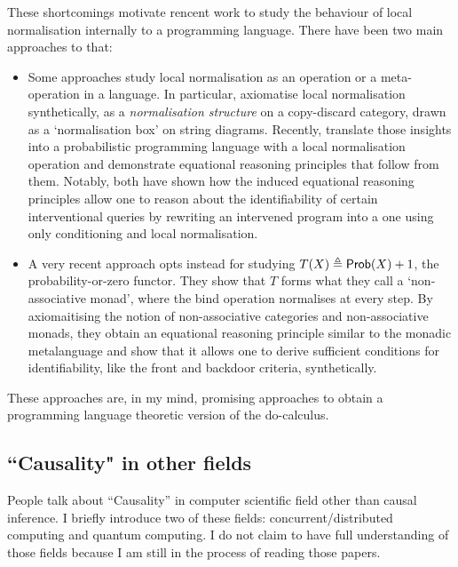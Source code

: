 \documentclass[11pt,a4paper]{article}
\begin{document}
These shortcomings motivate rencent work \cite{jacobsszelesstein2025inference,lorenz2023causalmodelsstringdiagrams,agrawal2026equational,dilavore2026normalizedprobabilisticsemanticsassociative} to study the behaviour of local normalisation internally to a programming language. There have been two main approaches to that:
\begin{itemize}
    \item Some approaches study local normalisation as an operation or a meta-operation in a language. In particular, \cite{jacobsszelesstein2025inference,lorenz2023causalmodelsstringdiagrams} axiomatise local normalisation synthetically, as a \emph{normalisation structure} on a copy-discard category, drawn as a `normalisation box' on string diagrams. Recently, \cite{agrawal2026equational} translate those insights into a probabilistic programming language with a local normalisation operation and demonstrate equational reasoning principles that follow from them. Notably, both have shown how the induced equational reasoning principles allow one to reason about the identifiability of certain interventional queries by rewriting an intervened program into a one using only conditioning and local normalisation.
    \item A very recent approach \cite{dilavore2026normalizedprobabilisticsemanticsassociative} opts instead for studying $T(X) \triangleq \mathsf{Prob}(X) + 1$, the probability-or-zero functor. They show that $T$ forms what they call a `non-associative monad', where the bind operation normalises at every step. By axiomaitising the notion of non-associative categories and non-associative monads, they obtain an equational reasoning principle similar to the monadic metalanguage and show that it allows one to derive sufficient conditions for identifiability, like the front and backdoor criteria, synthetically. 
\end{itemize}
These approaches are, in my mind, promising approaches to obtain a programming language theoretic version of the do-calculus. 

\subsection{``Causality" in other fields}\label{sec:otherfields}
People talk about ``Causality'' in computer scientific field other than causal inference. I briefly introduce two of these fields: concurrent/distributed computing and quantum computing. I do not claim to have full understanding of those fields because I am still in the process of reading those papers. 
\end{document}
